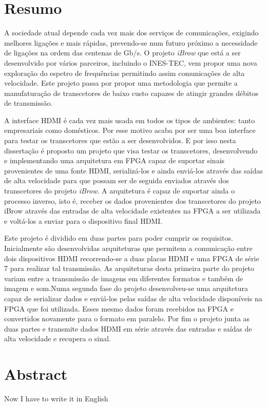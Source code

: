 \chapter*{Resumo}

A sociedade atual depende cada vez mais dos serviços de comunicações, exigindo melhores ligações e mais rápidas, prevendo-se num futuro próximo a necessidade de ligações na ordem das centenas de Gb/s. O projeto \textit{iBrow} que está a ser desenvolvido por vários parceiros, incluindo o INES-TEC, vem propor uma nova exploração do espetro de frequências permitindo assim comunicações de alta velocidade. Este projeto passa por propor uma metodologia que permite a manufaturação de transcetores de baixo custo capazes de atingir grandes débitos de transmissão. 

A interface HDMI é cada vez mais usada em todos os tipos de ambientes: tanto empresariais como domésticos. Por esse motivo acaba por ser uma boa interface para testar os transcetores que estão a ser desenvolvidos. E por isso nesta dissertação é proposto um projeto que visa testar os transcetores, desenvolvendo e implementando uma arquitetura em FPGA capaz de suportar sinais provenientes de uma fonte HDMI, serializá-los e ainda enviá-los através das saídas de alta velocidade para que possam ser de seguida enviados através dos transcetores do projeto \textit{iBrow}. A arquitetura é capaz de suportar ainda o processo inverso, isto é, receber os dados provenientes dos transcetores do projeto iBrow através das entradas de alta velocidade existentes na FPGA a ser utilizada e voltá-los a enviar para o dispositivo final HDMI.

Este projeto é dividido em duas partes para poder cumprir os requisitos. Inicialmente são desenvolvidas arquiteturas que permitem a comunicação entre dois dispositivos HDMI recorrendo-se a duas placas HDMI e uma FPGA de série 7 para realizar tal transmissão. As arquiteturas desta primeira parte do projeto variam entre a transmissão de imagens em diferentes formatos e também de imagem e som.Numa segunda fase do projeto desenvolveu-se uma arquitetura capaz de serializar dados e enviá-los pelas saídas de alta velocidade disponíveis na FPGA que foi utilizada. Esses mesmo dados foram recebidos na FPGA e convertidos novamente para o formato em paralelo. Por fim o projeto junta as duas partes e transmite dados HDMI em série através das entradas e saídas de alta velocidade e recupera o sinal.

\chapter*{Abstract}

Now I have to write it in English
